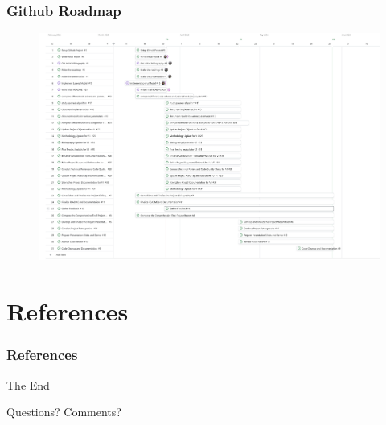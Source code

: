 \documentclass[
	11pt,
]{beamer}
\begin{document}
\begin{frame}
	\frametitle{Github Roadmap}
	\begin{figure}
		\includegraphics[width=.90\linewidth]{roadmap.jpg}
	\end{figure}
\end{frame}



\section{References}

\begin{frame}[allowframebreaks]
	\frametitle{References}
	
	
  \end{frame}


\begin{frame}
	\begin{center}
		{\Huge The End}

		\bigskip\bigskip

		{\LARGE Questions? Comments?}
	\end{center}
\end{frame}

\end{document}
